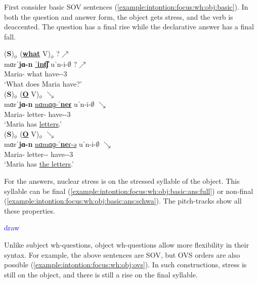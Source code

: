 First consider basic SOV sentences (\ref{example:intontion:focus:wh:obj:basic}). In both the question and answer form, the object   gets stress, and the verb is deaccented. The question has a final rise while the declarative answer has a final fall. 

\begin{exe}
	\ex \label{example:intontion:focus:wh:obj:basic}\begin{xlist}
		\ex \glll (\textbf{S})$_\phi$ (\underline{\textbf{what}} V)$_\phi$ ?$\nearrow$ \\
		mɑrˈ\textbf{jɑ-n} \underline{ˈ\textbf{int͡ʃ}} uˈn-i-$\emptyset$ ?$\nearrow$ \\
		Maria-{} what have-{\thgloss}-3{\sg} \\ 
		\trans `What does Maria have?' 
		\\ 
		\ex \glll (\textbf{S})$_\phi$ (\underline{\textbf{O}} V)$_\phi$  $\searrow$ \\
		mɑrˈ\textbf{jɑ-n} \underline{nɑmɑɡ-ˈ\textbf{neɾ}} uˈn-i-$\emptyset$  $\searrow$ \\
		Maria-{} letter-{\pl} have-{\thgloss}-3{\sg} \\ 
		\trans `Maria has \underline{letters}.'
		\label{example:intontion:focus:wh:obj:basic:ans:full}
		\\ 
		\ex \glll (\textbf{S})$_\phi$ (\underline{\textbf{O}} V)$_\phi$  $\searrow$ \\
		mɑrˈ\textbf{jɑ-n} \underline{nɑmɑɡ-ˈ\textbf{ne}ɾ-ə} uˈn-i-$\emptyset$  $\searrow$ \\
		Maria-{} letter-{\pl}-{} have-{\thgloss}-3{\sg} \\ 
		\trans `Maria has \underline{the letters}.'
		\label{example:intontion:focus:wh:obj:basic:ans:schwa}
		\\ 
	\end{xlist}
\end{exe}

For the answers, nuclear stress is on the stressed syllable of the object. This syllable can be final (\ref{example:intontion:focus:wh:obj:basic:ans:full}) or non-final (\ref{example:intontion:focus:wh:obj:basic:ans:schwa}).  The pitch-tracks show all these properties. 

\textcolor{blue}{draw}


Unlike subject wh-questions, object wh-questions allow more flexibility in their syntax. For example, the above sentences are SOV, but OVS orders are also possible (\ref{example:intontion:focus:wh:obj:ovs}). In such constructions, stress is still on the object, and there is still a rise on the final syllable. 


